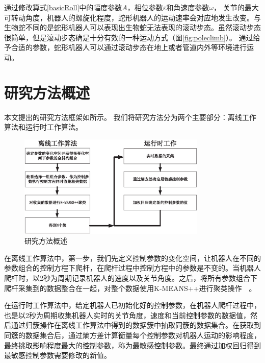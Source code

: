 通过修改算式\ref{basicRoll}中的幅度参数$A$，相位参数$\varepsilon$和角速度参数$\omega$， 关节的最大可转动角度，机器人的螺旋化程度，蛇形机器人的运动速率会对应地发生改变。与生物蛇不同的是蛇形机器人可以表现出生物蛇无法表现的滚动步态。虽然滚动步态很简单，但是滚动步态确是十分有效的一种运动方式（图\ref{fig:poleclimb}）。 通过给予合适的参数，蛇形机器人可以通过滚动步态在地上或者管道内外等环境进行运动。

\section{研究方法概述}
本文提出的研究方法框架如所示。 我们将研究方法分为两个主要部分：离线工作算法和运行时工作算法。
\begin{figure}[h]
	\centering
	\includegraphics[width=0.8\textwidth]{figure/chap03/step.eps}
	\caption{研究方法概述}
	\label{fig:stepMap}
\end{figure}

在离线工作算法中，第一步，我们先定义控制参数的变化空间，让机器人在不同的参数组合的控制方程下爬杆，在爬杆过程中控制方程中的参数是不变的。当机器人爬杆时，以2秒为周期记录机器人的速度以及关节角度。之后，将所有参数组合下爬杆采集到的数据整合在一起，对整个数据使用K-MEANS++进行聚类操作~\cite{Cluseter_ICT}~\cite{KmeansAndDeepLearning}。

在运行时工作算法中，给定机器人已初始化好的控制参数，在机器人爬杆过程中，也是以2秒为周期收集机器人实时的关节角度，速度和当前控制参数的数据值，然后通过归簇操作在离线工作算法中得到的数据簇中抽取同簇的数据集合。在获取到同簇的数据集合后，通过熵方差计算衡量每个控制参数对机器人运动的影响程度，最终挑取影响程度最大的控制参数，称为最敏感控制参数。最终通过加权回归得到最敏感控制参数需要修改的新值。

